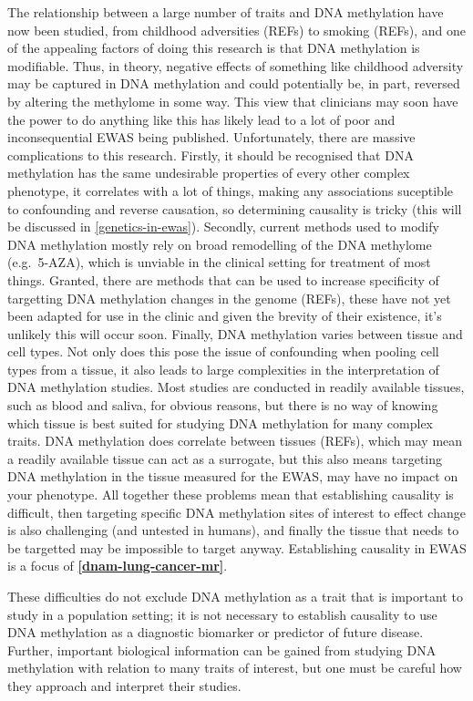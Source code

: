 \documentclass[11pt,twoside]{bristolthesis}
\begin{document}
The relationship between a large number of traits and DNA methylation have now been studied, from childhood adversities (REFs) to smoking (REFs), and one of the appealing factors of doing this research is that DNA methylation is modifiable. Thus, in theory, negative effects of something like childhood adversity may be captured in DNA methylation and could potentially be, in part, reversed by altering the methylome in some way. This view that clinicians may soon have the power to do anything like this has likely lead to a lot of poor and inconsequential EWAS being published. Unfortunately, there are massive complications to this research. Firstly, it should be recognised that DNA methylation has the same undesirable properties of every other complex phenotype, it correlates with a lot of things, making any associations suceptible to confounding and reverse causation, so determining causality is tricky (this will be discussed in \ref{genetics-in-ewas}). Secondly, current methods used to modify DNA methylation mostly rely on broad remodelling of the DNA methylome (e.g.~5-AZA), which is unviable in the clinical setting for treatment of most things. Granted, there are methods that can be used to increase specificity of targetting DNA methylation changes in the genome (REFs), these have not yet been adapted for use in the clinic and given the brevity of their existence, it's unlikely this will occur soon. Finally, DNA methylation varies between tissue and cell types. Not only does this pose the issue of confounding when pooling cell types from a tissue, it also leads to large complexities in the interpretation of DNA methylation studies. Most studies are conducted in readily available tissues, such as blood and saliva, for obvious reasons, but there is no way of knowing which tissue is best suited for studying DNA methylation for many complex traits. DNA methylation does correlate between tissues (REFs), which may mean a readily available tissue can act as a surrogate, but this also means targeting DNA methylation in the tissue measured for the EWAS, may have no impact on your phenotype. All together these problems mean that establishing causality is difficult, then targeting specific DNA methylation sites of interest to effect change is also challenging (and untested in humans), and finally the tissue that needs to be targetted may be impossible to target anyway. Establishing causality in EWAS is a focus of \textbf{\ref{dnam-lung-cancer-mr}}.

These difficulties do not exclude DNA methylation as a trait that is important to study in a population setting; it is not necessary to establish causality to use DNA methylation as a diagnostic biomarker or predictor of future disease. Further, important biological information can be gained from studying DNA methylation with relation to many traits of interest, but one must be careful how they approach and interpret their studies.
\end{document}
